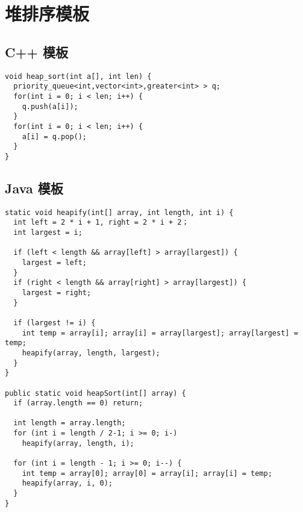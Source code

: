 \newpage
\section{堆排序模板}

\subsection{C++ 模板}

\begin{verbatim}
void heap_sort(int a[], int len) {
  priority_queue<int,vector<int>,greater<int> > q;
  for(int i = 0; i < len; i++) {
    q.push(a[i]);
  }
  for(int i = 0; i < len; i++) {
    a[i] = q.pop();
  }
}
\end{verbatim}

\subsection{Java 模板}

\begin{verbatim}
static void heapify(int[] array, int length, int i) {
  int left = 2 * i + 1, right = 2 * i + 2；
  int largest = i;

  if (left < length && array[left] > array[largest]) {
    largest = left;
  }
  if (right < length && array[right] > array[largest]) {
    largest = right;
  }

  if (largest != i) {
    int temp = array[i]; array[i] = array[largest]; array[largest] = temp;
    heapify(array, length, largest);
  }
}

public static void heapSort(int[] array) {
  if (array.length == 0) return;

  int length = array.length;
  for (int i = length / 2-1; i >= 0; i-)
    heapify(array, length, i);

  for (int i = length - 1; i >= 0; i--) {
    int temp = array[0]; array[0] = array[i]; array[i] = temp;
    heapify(array, i, 0);
  }
}
\end{verbatim}
